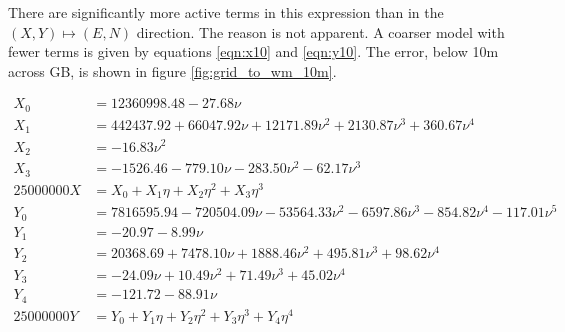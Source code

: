 \documentclass[10pt,a4paper]{article}
\begin{document}
There are significantly more active terms in this expression than in the $(X,Y)
\mapsto (E, N)$ direction.  The reason is not apparent.  A coarser model
with fewer terms is given by equations \eqref{eqn:x10} and \eqref{eqn:y10}.
The error, below 10m across GB, is shown in figure \ref{fig:grid_to_wm_10m}.

\begin{align}
X_0 &= 12360998.48 -27.68\nu\nonumber \\
X_1 &= 442437.92 +66047.92\nu +12171.89\nu^2 +2130.87\nu^3 +360.67\nu^4\nonumber \\
X_2 &= -16.83\nu^2\nonumber \\
X_3 &= -1526.46 -779.10\nu -283.50\nu^2 -62.17\nu^3\nonumber \\
25000000 X &= X_0 +X_1\eta +X_2\eta^2 +X_3\eta^3
  \label{eqn:x10}
\\[1ex]
Y_0 &= 7816595.94 -720504.09\nu -53564.33\nu^2 -6597.86\nu^3 -854.82\nu^4 -117.01\nu^5\nonumber \\
Y_1 &= -20.97 -8.99\nu\nonumber \\
Y_2 &= 20368.69 +7478.10\nu +1888.46\nu^2 +495.81\nu^3 +98.62\nu^4\nonumber \\
Y_3 &= -24.09\nu +10.49\nu^2 +71.49\nu^3 +45.02\nu^4\nonumber \\
Y_4 &= -121.72 -88.91\nu\nonumber \\
25000000 Y &= Y_0 +Y_1\eta +Y_2\eta^2 +Y_3\eta^3 +Y_4\eta^4
  \label{eqn:y10}
\end{align}
\end{document}
